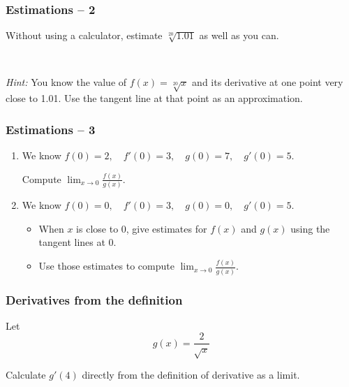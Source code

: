 \documentclass[14pt]{beamer}
\newcommand {\DS} [1] {${\displaystyle #1}$}
\newcommand{\setsize}[1]{\fontsize{#1}{#1}\selectfont} %
\newcommand{\smallerfont}{\setsize{13}} %
\begin{document}

\begin{frame}
\frametitle{Estimations -- 2}


Without using a calculator, estimate \DS{\sqrt[20]{1.01}} as well as you can.

\

\emph{Hint:}  You know the value of \DS{f(x) = \sqrt[20]{x}} and its derivative at one point very close to 1.01.  Use the tangent line at that point as an approximation.
 
\end{frame}
\begin{frame}[t]
\smallerfont
\frametitle{Estimations -- 3}



\begin{enumerate}
\item  We know \quad
	\DS{
		f(0) = 2, \quad f'(0) = 3, \quad g(0) = 7, \quad g'(0) = 5.
	}
	
	\vspace{.2cm}
 	Compute \; \DS{\lim_{x \to 0} \frac{f(x)}{g(x)}}.

\vfill

\item  We know \quad 
	\DS{
		f(0) = 0, \quad f'(0) = 3, \quad g(0) = 0, \quad g'(0) = 5.
	}
	
	\vspace{.2cm}
 	\begin{itemize}
		\item  When $x$ is close to $0$, give estimates for \DS{f(x)} and \DS{g(x)} using the tangent lines at $0$. 
		\item Use those estimates to compute \;  \DS{\lim_{x \to 0} \frac{f(x)}{g(x)}}.
	\end{itemize}
	
\end{enumerate}
 
 \vfill
 
\end{frame}

\begin{frame}[t]
\frametitle{Derivatives from the definition}

Let 
	$$g(x) = \frac{2}{\sqrt{x}} $$
	
Calculate \DS{g'(4)} directly from the definition of derivative as a limit.

\end{frame}
\end{document}
